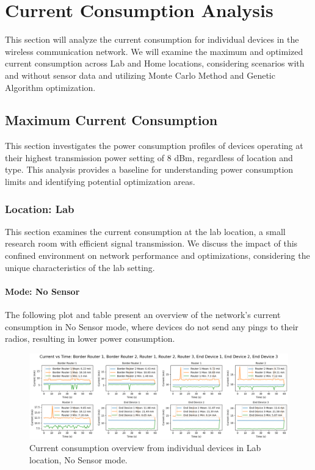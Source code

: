 \section{Current Consumption Analysis}
This section will analyze the current consumption for individual devices in the wireless communication network. We will examine the maximum and optimized current consumption across Lab and Home locations, considering scenarios with and without sensor data and utilizing Monte Carlo Method and Genetic Algorithm optimization.

\subsection{Maximum Current Consumption}
This section investigates the power consumption profiles of devices operating at their highest transmission power setting of 8 dBm, regardless of location and type. This analysis provides a baseline for understanding power consumption limits and identifying potential optimization areas.

\subsubsection{Location: Lab}
This section examines the current consumption at the lab location, a small research room with efficient signal transmission. We discuss the impact of this confined environment on network performance and optimizations, considering the unique characteristics of the lab setting.

\paragraph{Mode: No Sensor}
The following plot and table present an overview of the network's current consumption in No Sensor mode, where devices do not send any pings to their radios, resulting in lower power consumption.

\begin{figure}[H]
  \centering
  \includegraphics[width=1\textwidth]{images/research_results/current_consumption_analysis/maximum/lab/no_sensor/overview.png}
    \caption{Current consumption overview from individual devices in Lab location, No Sensor mode.}
    \label{fig:current_consumption_lab_no_sensor_overview}
\end{figure}


